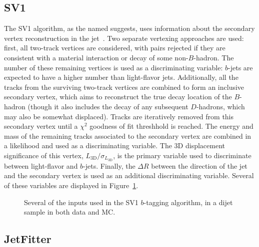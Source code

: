 

\subsection{SV1}

The SV1 algorithm, as the named suggests, uses information about the secondary vertex reconstruction in the jet~\cite{ATLAS-B}. Two separate vertexing approaches are used: first, all two-track vertices are considered, with pairs rejected if they are consistent with a material interaction or decay of some non-$B$-hadron. The number of these remaining vertices is used as a discriminating variable: $b$-jets are expected to have a higher number than light-flavor jets. Additionally, all the tracks from the surviving two-track vertices are combined to form an inclusive secondary vertex, which aims to reconstruct the true decay location of the $B$-hadron (though it also includes the decay of any subsequent $D$-hadrons, which may also be somewhat displaced). Tracks are iteratively removed from this secondary vertex until a $\chi^2$ goodness of fit threshhold is reached. The energy and mass of the remaining tracks associated to the secondary vertex are combined in a likelihood and used as a discriminating variable. The 3D displacement significance of this vertex, $L_{\mathrm{3D}} / \sigma_{L_\mathrm{3D}}$, is the primary variable used to discriminate between light-flavor and $b$-jets. Finally, the $\Delta R$ between the direction of the jet and the secondary vertex is used as an additional discriminating variable. Several of these variables are displayed in Figure~\ref{fig:jet-reconstruction:b-tagging:sv1}. 


\begin{figure}
\centering
{}
\label{fig:jet-reconstruction:b-tagging:sv1}
\caption{Several of the inputs used in the SV1 $b$-tagging algorithm, in a dijet sample in both data and MC.}
\end{figure}


\subsection{JetFitter}


